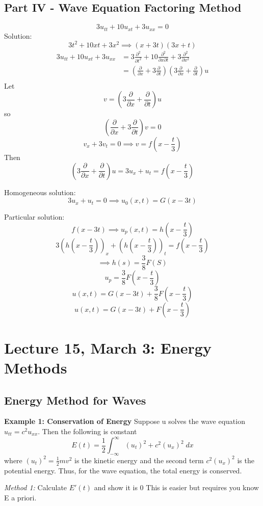 \documentclass[12pt]{article}
\begin{document}
\subsection*{Part IV - Wave Equation Factoring Method}
\[3u_{tt} + 10u_{xt} + 3u_{xx} = 0\]
Solution:
\[3t^2 + 10xt + 3x^2 \implies \left(x + 3t\right)\left(3x+ t\right)\]
\begin{align*}
    3u_{tt} + 10u_{xt} + 3u_{xx} &= 3\frac{\partial^2}{\partial t^2}+ 10\frac{\partial^2}{\partial x\partial t} + 3\frac{\partial^2}{\partial x^2}\\
    &= \left(\frac{\partial}{\partial x}+ 3\frac{\partial}{\partial t}\right)\left(3\frac{\partial}{\partial x}+ \frac{\partial}{\partial t}\right)u\\
\end{align*}
Let 
\[v = \left(3\frac{\partial}{\partial x}+ \frac{\partial}{\partial t}\right)u\]
so 
\[\left(\frac{\partial}{\partial x}+ 3\frac{\partial}{\partial t}\right)v = 0\]
\[v_x + 3v_t = 0 \implies v = f(x - \frac{t}{3})\]
Then
\[\left(3\frac{\partial}{\partial x}+ \frac{\partial}{\partial t}\right)u = 3u_x + u_t  = f(x - \frac{t}{3})\]

Homogeneous solution:
\[3u_x + u_t = 0 \implies u_0(x, t) = G(x - 3t)\]

Particular solution:
\[f(x - 3t) \implies u_p(x, t) = h(x - \frac{t}{3})\]
\[3(h(x - \frac{t}{3}))_x + (h(x - \frac{t}{3}))_t = f(x - \frac{t}{3})\]
\[\implies h(s) = \frac{3}{8}F(S)\]
\[u_p = \frac{3}{8}F(x - \frac{t}{3})\]
\[u(x, t) = G(x - 3t) + \frac{3}{8}F(x - \frac{t}{3})\]
\[\boxed{u(x, t) = G(x - 3t) + F(x - \frac{t}{3})}\]

\section{Lecture 15, March 3: Energy Methods}
\subsection*{Energy Method for Waves}
\textbf{Example 1: Conservation of Energy}
Suppose u solves the wave equation $u_{tt} = c^2 u_{xx}$. Then the following is constant 
\[E(t) = \frac{1}{2}\int_{-\infty}^\infty (u_t)^2 + c^2(u_x)^2\; dx\]
where $(u_t)^2 = \frac{1}{2}mv^2$ is the kinetic energy and the second term $c^2(u_x)^2$ is the potential energy. Thus, for the wave equation, the total energy is conserved. 

\emph{Method 1:} Calculate $E'(t)$ and show it is 0
This is easier but requires you know E a priori.
\end{document}

